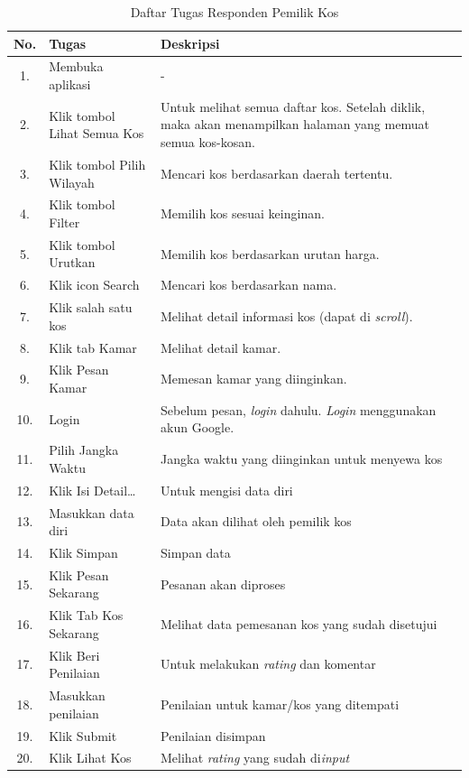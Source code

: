 \begin{enumerate}[a.]
		\begin{longtable}{ |c|p{5cm}|p{7cm}| }
			\caption{Daftar Tugas Responden Pemilik Kos}
			\label{skenarioPencari} \\
			\hline No. & Tugas & Deskripsi \\
			\hline
			1. & Membuka aplikasi & - \\
			\hline
			2. & Klik tombol Lihat Semua Kos & Untuk melihat semua daftar kos. Setelah diklik, maka akan menampilkan halaman yang memuat semua kos-kosan. \\
			\hline
			3. & Klik tombol Pilih Wilayah & Mencari kos berdasarkan daerah tertentu. \\
			\hline
			4. & Klik tombol Filter & Memilih kos sesuai keinginan. \\
			\hline
			5. & Klik tombol Urutkan & Memilih kos berdasarkan urutan harga. \\
			\hline
			6. & Klik icon Search & Mencari kos berdasarkan nama. \\
			\hline
			7. & Klik salah satu kos & Melihat detail informasi kos (dapat di \textit{scroll}). \\
			\hline
			8. & Klik tab Kamar & Melihat detail kamar. \\
			\hline
			9. & Klik Pesan Kamar & Memesan kamar yang diinginkan. \\
			\hline
			10. & Login	& Sebelum pesan, \textit{login }dahulu. \textit{Login} menggunakan akun Google. \\
			\hline
			11. & Pilih Jangka Waktu & Jangka waktu yang diinginkan untuk menyewa kos \\
			\hline
			12. & Klik Isi Detail… & Untuk mengisi data diri \\
			\hline
			13. & Masukkan data diri & Data akan dilihat oleh pemilik kos \\
			\hline
			14. & Klik Simpan & Simpan data \\
			\hline
			15. & Klik Pesan Sekarang & Pesanan akan diproses \\
			\hline
			16. & Klik Tab Kos Sekarang & Melihat data pemesanan kos yang sudah disetujui \\
			\hline
			17. & Klik Beri Penilaian & Untuk melakukan \textit{rating} dan komentar \\
			\hline
			18. & Masukkan penilaian & Penilaian untuk kamar/kos yang ditempati \\
			\hline
			19. & Klik Submit & Penilaian disimpan \\
			\hline
			20. & Klik Lihat Kos & Melihat \textit{rating }yang sudah di\textit{input} \\

\end{longtable}
\end{enumerate}
